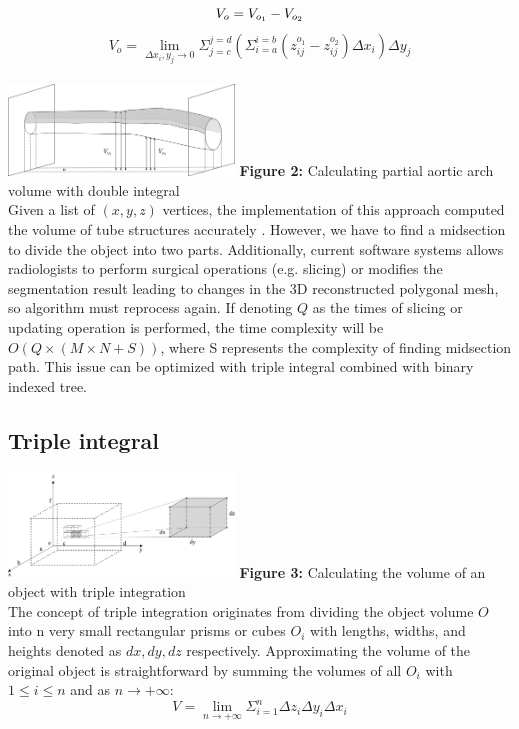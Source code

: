 \documentclass[11pt]{article}
\begin{document}
\begin{multicols}{2}
$$
V_o = V_{o_1} - V_{o_2} \\
$$
$$
V_o = \lim_{\Delta x_i, y_j \rightarrow 0} \Sigma_{j=c}^{j=d} (\Sigma_{i=a}^{i=b} (z^{o_1}_{ij} - z^{o_2}_{ij}) \Delta x_i) \Delta y_j
$$ \\

\includegraphics[width=0.45\textwidth]{Figures/Exclusion.png}
\textbf{Figure 2:} Calculating partial aortic arch volume with double integral \\

Given a list of $(x,y,z)$ vertices, the implementation of this approach computed the volume of tube structures accurately . However, we have to find a midsection to divide the object into two parts. Additionally, current software systems \cite{vascular} allows radiologists to perform surgical operations (e.g. slicing) or modifies the segmentation result leading to changes in the 3D reconstructed polygonal mesh, so algorithm must reprocess again. If denoting $Q$ as the times of slicing or updating operation is performed, the time complexity will be $O (Q \times (M \times N + S))$, where S represents the complexity of finding midsection path. This issue can be optimized with triple integral combined with binary indexed tree.

\subsection{Triple integral}
\includegraphics[width=0.45\textwidth]{Figures/Triple Integral.png}
\textbf{Figure 3:} Calculating the volume of an object with triple integration  \\

The concept of triple integration originates from dividing the object volume $O$ into n very small rectangular prisms or cubes $O_i$ with lengths, widths, and heights denoted as $dx,dy,dz$ respectively. Approximating the volume of the original object is straightforward by summing the volumes of all $O_i$ with $1 \leq i \leq n$ and as $n \rightarrow +\infty$:
$$
V = \lim_{n \rightarrow + \infty} \Sigma_{i=1}^{n} \Delta z_i \Delta y_i \Delta x_i
$$


\end{multicols}
\end{document}
